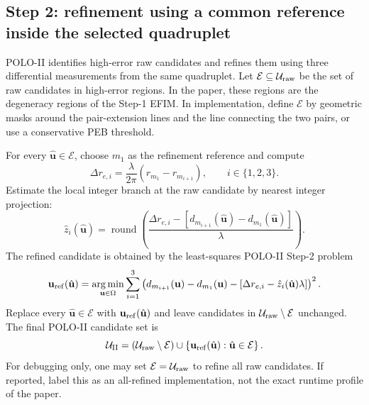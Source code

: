 \documentclass[11pt]{article}
\newcommand{\argmin}{\operatorname*{arg\,min}}
\newcommand{\round}{\operatorname{round}}
\begin{document}
\subsection{Step 2: refinement using a common reference inside the selected quadruplet}

POLO-II identifies high-error raw candidates and refines them using three differential measurements from the same quadruplet. Let $\mathcal{E}\subseteq\mathcal{U}_{\rm raw}$ be the set of raw candidates in high-error regions. In the paper, these regions are the degeneracy regions of the Step-1 EFIM. In implementation, define $\mathcal{E}$ by geometric masks around the pair-extension lines and the line connecting the two pairs, or use a conservative PEB threshold.

For every $\hat{\mathbf{u}}\in\mathcal{E}$, choose $m_1$ as the refinement reference and compute
\begin{equation}
    \Delta r_{e,i}=\frac{\lambda}{2\pi}\left(r_{m_1}-r_{m_{i+1}}\right),
    \qquad i\in\{1,2,3\}.
\end{equation}
Estimate the local integer branch at the raw candidate by nearest integer projection:
\begin{equation}
    \hat z_i(\hat{\mathbf{u}})
    =\round\left(
    \frac{\Delta r_{e,i}-\left[d_{m_{i+1}}(\hat{\mathbf{u}})-d_{m_1}(\hat{\mathbf{u}})\right]}{\lambda}
    \right).
    \label{eq:polo_ii_branch_refine}
\end{equation}
The refined candidate is obtained by the least-squares POLO-II Step-2 problem
\begin{equation}
    \mathbf{u}_{\rm ref}(\hat{\mathbf{u}})
    =\argmin_{\mathbf{u}\in\Omega}
    \sum_{i=1}^{3}\left(
    d_{m_{i+1}}(\mathbf{u})-d_{m_1}(\mathbf{u})
    -\left[\Delta r_{e,i}-\hat z_i(\hat{\mathbf{u}})\lambda\right]
    \right)^2.
    \label{eq:polo_ii_refine_ls}
\end{equation}
Replace every $\hat{\mathbf{u}}\in\mathcal{E}$ with $\mathbf{u}_{\rm ref}(\hat{\mathbf{u}})$ and leave candidates in $\mathcal{U}_{\rm raw}\setminus\mathcal{E}$ unchanged. The final POLO-II candidate set is
\begin{equation}
    \mathcal{U}_{\rm II}
    =\left(\mathcal{U}_{\rm raw}\setminus\mathcal{E}\right)
    \cup
    \left\{\mathbf{u}_{\rm ref}(\hat{\mathbf{u}}):\hat{\mathbf{u}}\in\mathcal{E}\right\}.
\end{equation}
For debugging only, one may set $\mathcal{E}=\mathcal{U}_{\rm raw}$ to refine all raw candidates. If reported, label this as an all-refined implementation, not the exact runtime profile of the paper.
\end{document}
